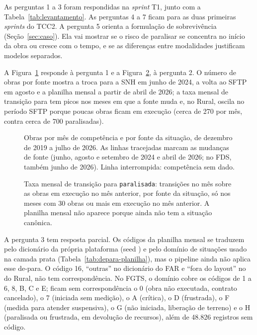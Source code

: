 As perguntas 1 a 3 foram respondidas na \textit{sprint} T1, junto com a Tabela~\ref{tab:levantamento}. As perguntas 4 a 7 ficam para as duas primeiras \textit{sprints} do TCC2. A pergunta 5 orienta a formulação de sobrevivência (Seção~\ref{sec:caso}). Ela vai mostrar se o risco de paralisar se concentra no início da obra ou cresce com o tempo, e se as diferenças entre modalidades justificam modelos separados.

A Figura~\ref{fig:obras-fonte} responde à pergunta 1 e a Figura~\ref{fig:taxa-fonte}, à pergunta 2. O número de obras por fonte mostra a troca para a SNH em junho de 2024, a volta ao SFTP em agosto e a planilha mensal a partir de abril de 2026; a taxa mensal de transição para  tem picos nos meses em que a fonte muda e, no Rural, oscila no período SFTP porque poucas obras ficam em execução (cerca de 270 por mês, contra cerca de 700 paralisadas).

\begin{figure}[htbp]
	\centering
	
	\caption{Obras por mês de competência e por fonte da situação, de dezembro de 2019 a julho de 2026. As linhas tracejadas marcam as mudanças de fonte (junho, agosto e setembro de 2024 e abril de 2026; no FDS, também junho de 2026). Linha interrompida: competência sem dado.}
	\label{fig:obras-fonte}
\end{figure}

\begin{figure}[htbp]
	\centering
	
	\caption{Taxa mensal de transição para \texttt{paralisada}: transições no mês sobre as obras em execução no mês anterior, por fonte da situação, só nos meses com 30 obras ou mais em execução no mês anterior. A planilha mensal não aparece porque ainda não tem a situação canônica.}
	\label{fig:taxa-fonte}
\end{figure}

A pergunta 3 tem resposta parcial. Os códigos da planilha mensal se traduzem pelo dicionário da própria plataforma (seed ) e pelo domínio de situações usado na camada prata (Tabela~\ref{tab:depara-planilha}), mas o pipeline ainda não aplica esse de-para. O código 16, ``outras'' no dicionário do FAR e ``fora do layout'' no do Rural, não tem correspondência. No FGTS, o domínio cobre os códigos de 1 a 6, 8, B, C e E; ficam sem correspondência o 0 (obra não executada, contrato cancelado), o 7 (iniciada sem medição), o A (crítica), o D (frustrada), o F (medida para atender suspensiva), o G (não iniciada, liberação de terreno) e o H (paralisada ou frustrada, em devolução de recursos), além de 48.826 registros sem código.

